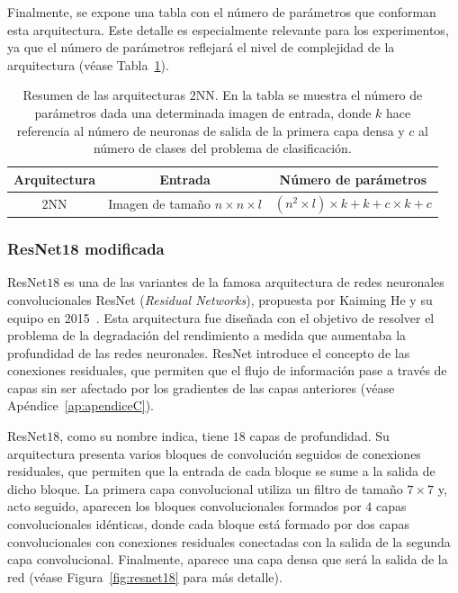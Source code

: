 Finalmente, se expone una tabla con el número de parámetros que conforman esta arquitectura. Este detalle es especialmente relevante para los experimentos, ya que el número de parámetros reflejará el nivel de complejidad de la arquitectura (véase Tabla~\ref{tab:numero-parametros}).\newline

\begin{table}[ht]
    \centering
    \renewcommand{\arraystretch}{1.5} 
    \begin{tabular}{|c|c|c|}
    \hline
    \textbf{Arquitectura}          & \textbf{Entrada}                                   & \textbf{Número de parámetros}                     \\ \hline
    $2$NN                & Imagen de tamaño $n \times n \times l$                & $(n^2 \times l) \times k + k + c \times k + c$                                             \\ \hline
    \end{tabular}
    \caption[Resumen de las arquitecturas $2$NN.]{Resumen de las arquitecturas $2$NN. En la tabla se muestra el número de parámetros dada una determinada imagen de entrada, donde $k$ hace referencia al número de neuronas de salida de la primera capa densa y $c$ al número de clases del problema de clasificación.}\label{tab:numero-parametros}
\end{table}

\subsubsection{ResNet18 modificada}\label{subsubsec:resnet18-modificada}

ResNet$18$ es una de las variantes de la famosa arquitectura de redes neuronales convolucionales ResNet (\textit{Residual Networks}), propuesta por Kaiming He y su equipo en 2015~\cite{He2015}. Esta arquitectura fue diseñada con el objetivo de resolver el problema de la degradación del rendimiento a medida que aumentaba la profundidad de las redes neuronales. ResNet introduce el concepto de las conexiones residuales, que permiten que el flujo de información pase a través de capas sin ser afectado por los gradientes de las capas anteriores (véase Apéndice~\ref{ap:apendiceC}).\newline

ResNet$18$, como su nombre indica, tiene $18$ capas de profundidad. Su arquitectura presenta varios bloques de convolución seguidos de conexiones residuales, que permiten que la entrada de cada bloque se sume a la salida de dicho bloque. La primera capa convolucional utiliza un filtro de tamaño $7 \times 7$ y, acto seguido, aparecen los bloques convolucionales formados por $4$ capas convolucionales idénticas, donde cada bloque está formado por dos capas convolucionales con conexiones residuales conectadas con la salida de la segunda capa convolucional. Finalmente, aparece una capa densa que será la salida de la red (véase Figura~\ref{fig:resnet18} para más detalle).\newline

